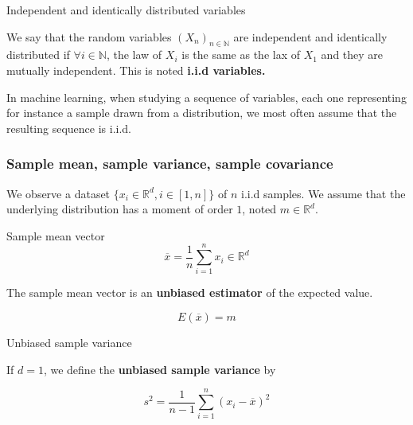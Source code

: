 \documentclass[
10pt, %
a4paper, %
oneside, %
headinclude,footinclude, %
BCOR5mm, %
]{scrartcl}
\begin{document}
\begin{definition}{Independent and identically distributed variables}

    We say that the random variables $(X_n)_{n\in \mathbb{N} }$ are independent and identically distributed if $\forall i\in \mathbb{N} $, the law of $X_i$ is the same as the lax of $X_1$ and they are mutually independent. This is noted \textbf{{i.i.d variables.}} 
\end{definition}

\begin{remark}
    In machine learning, when studying a sequence of variables, each one representing for instance a sample drawn from a distribution, we most often assume that the resulting sequence is i.i.d.
\end{remark}


\subsubsection{\large\color{Periwinkle}Sample mean, sample variance, sample covariance}
\label{sec:empstats}

We observe a dataset $ \{x_i\in \mathbb{R}^d, i\in [1, n]\}$ of $n$ i.i.d samples. We assume that the underlying distribution has a moment of order $1$, noted $m\in \mathbb{R}^d$.

\begin{definition}{Sample mean vector}
    \begin{equation*}
	\overline{x} = \frac{1}{n} \sum^{n}_{i=1} x_i\in \mathbb{R}^d
    \end{equation*}
\end{definition}

\begin{remark}
The sample mean vector is an \textbf{{unbiased estimator}} of the expected value.

\begin{equation*}
    E( \overline{x}) = m
\end{equation*}
\end{remark}

\begin{definition}{Unbiased sample variance}

    If $d=1$, we define the \textbf{{unbiased sample variance}} by

    \begin{equation*}
	s^2= \frac{1}{n-1}  \sum^{n}_{i=1} (x_i- \overline{x})^2
    \end{equation*}
\end{definition}
\end{document}

